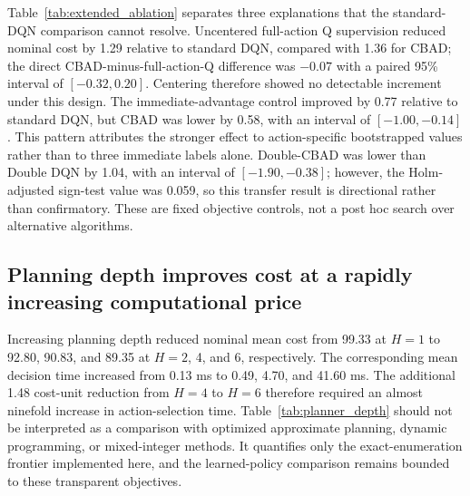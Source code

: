 \documentclass[11pt]{article}
\begin{document}
{Table~\ref{tab:extended_ablation} separates three explanations that the standard-DQN comparison cannot resolve. Uncentered full-action Q supervision reduced nominal cost by 1.29 relative to standard DQN, compared with 1.36 for CBAD; the direct CBAD-minus-full-action-Q difference was $-0.07$ with a paired 95\% interval of $[-0.32,0.20]$. Centering therefore showed no detectable increment under this design. The immediate-advantage control improved by 0.77 relative to standard DQN, but CBAD was lower by 0.58, with an interval of $[-1.00,-0.14]$. This pattern attributes the stronger effect to action-specific bootstrapped values rather than to three immediate labels alone. Double-CBAD was lower than Double DQN by 1.04, with an interval of $[-1.90,-0.38]$; however, the Holm-adjusted sign-test value was 0.059, so this transfer result is directional rather than confirmatory. These are fixed objective controls, not a post hoc search over alternative algorithms.

\subsection{Planning depth improves cost at a rapidly increasing computational price}

\begin{table}[H]
\centering
\caption{Nominal receding-horizon planning over 400 unique held-out traces. Each planner has perfect knowledge of the next $H$ tasks and exogenous link states and exactly enumerates $3^H$ sequences before every action. Runtime was measured on the same workstation and includes only action selection after environment construction.}
\label{tab:planner_depth}
\resizebox{0.85\textwidth}{!}{}
\end{table}

Increasing planning depth reduced nominal mean cost from 99.33 at $H=1$ to 92.80, 90.83, and 89.35 at $H=2$, 4, and 6, respectively. The corresponding mean decision time increased from 0.13 ms to 0.49, 4.70, and 41.60 ms. The additional 1.48 cost-unit reduction from $H=4$ to $H=6$ therefore required an almost ninefold increase in action-selection time. Table~\ref{tab:planner_depth} should not be interpreted as a comparison with optimized approximate planning, dynamic programming, or mixed-integer methods. It quantifies only the exact-enumeration frontier implemented here, and the learned-policy comparison remains bounded to these transparent objectives.
}%
\end{document}
